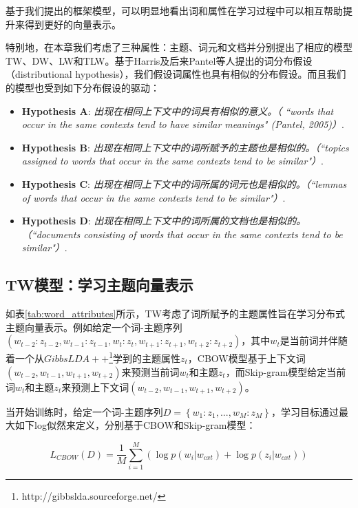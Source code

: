 \documentclass[master]{njuthesis}
\begin{document}
基于我们提出的框架模型，可以明显地看出词和属性在学习过程中可以相互帮助提升来得到更好的向量表示。

特别地，在本章我们考虑了三种属性：主题、词元和文档并分别提出了相应的模型TW、DW、LW和TLW。基于Harris及后来Pantel等人提出的词分布假设（distributional hypothesis）\cite{harris1954distributional,pantel2005inducing}，我们假设词属性也具有相似的分布假设。而且我们的模型也受到如下分布假设的驱动：

\begin{itemize}
\item \textbf{Hypothesis A}: {\em 出现在相同上下文中的词具有相似的意义。（ ``words that occur in the same contexts tend to have similar meanings" (Pantel, 2005)）}.
\item \textbf{Hypothesis B}: {\em 出现在相同上下文中的词所赋予的主题也是相似的。（``topics assigned to words that occur in the same contexts tend to be similar"）}.
\item \textbf{Hypothesis C}: {\em 出现在相同上下文中的词所属的词元也是相似的。（``lemmas of words that occur in the same contexts tend to be similar"）}.
\item \textbf{Hypothesis D}: {\em 出现在相同上下文中的词所属的文档也是相似的。（``documents consisting of words that occur in the same contexts tend to be similar"）}.
\end{itemize}

\subsection{TW模型：学习主题向量表示}\label{subsec_tw_chap4}

如表\ref{tab:word_attributes}所示，TW考虑了词所赋予的主题属性旨在学习分布式主题向量表示。例如给定一个词-主题序列$(w_{t-2}:z_{t-2}, w_{t-1}:z_{t-1}, w_t:z_t, w_{t+1}:z_{t+1}, w_{t+2}:z_{t+2})$，其中$w_t$是当前词并伴随着一个从$GibbsLDA++$\footnote{http://gibbslda.sourceforge.net/}学到的主题属性$z_t$，CBOW模型基于上下文词$(w_{t-2}, w_{t-1}, w_{t+1}, w_{t+2})$来预测当前词$w_t$和主题$z_t$，而Skip-gram模型给定当前词$w_t$和主题$z_t$来预测上下文词$(w_{t-2}, w_{t-1}, w_{t+1}, w_{t+2})$。

当开始训练时，给定一个词-主题序列$D=\left \{w_{1}:z_{1},...,w_{M}:z_{M}  \right \}$，学习目标通过最大如下log似然来定义，分别基于CBOW和Skip-gram模型：

	\begin{equation}\label{eq:tw_cbow_chap4}
	{L}_{CBOW}(D)=\frac{1}{M}\sum_{i=1}^{M}(\log p(w_{i}|w_{cxt})+\log p(z_{i}|w_{cxt}))
	\end{equation}
	
\end{document}
